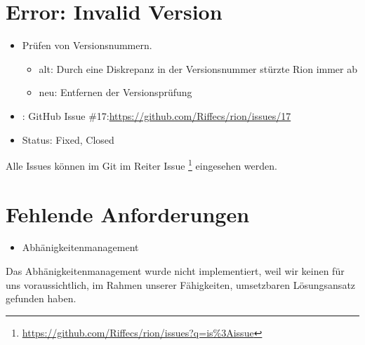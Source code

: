 \section{Error: Invalid Version}
\begin{itemize}
    \item Prüfen von Versionsnummern.
    \begin{itemize}
        \item alt: Durch eine Diskrepanz in der Versionsnummer stürzte Rion immer ab
        \item neu: Entfernen der Versionsprüfung
    \end{itemize}
    \item: GitHub Issue \#17:\url{https://github.com/Riffecs/rion/issues/17}
    \item Status: Fixed, Closed
\end{itemize}

Alle Issues können im Git im Reiter Issue \footnote{\url{https://github.com/Riffecs/rion/issues?q=is\%3Aissue}} eingesehen werden.

\section{Fehlende Anforderungen}
\begin{itemize}
    \item  Abhänigkeitenmanagement
\end{itemize}

Das Abhänigkeitenmanagement wurde nicht implementiert, weil wir keinen für uns voraussichtlich, im Rahmen unserer Fähigkeiten, umsetzbaren Lösungsansatz gefunden haben. 